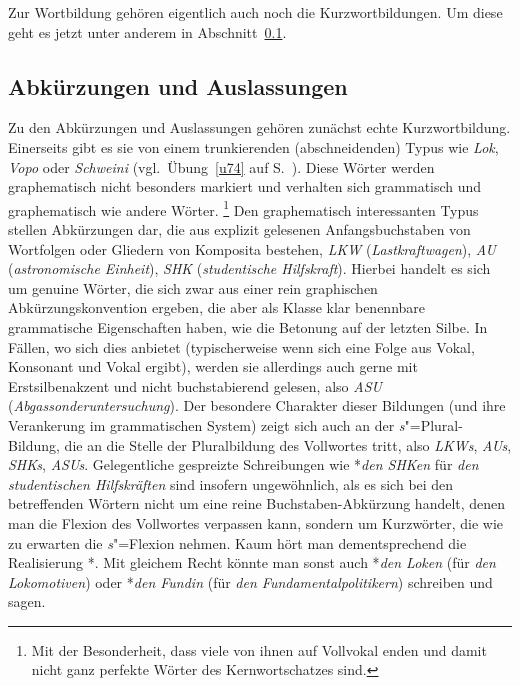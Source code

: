 Zur Wortbildung gehören eigentlich auch noch die Kurzwortbildungen.
Um diese geht es jetzt unter anderem in Abschnitt~\ref{sec:abkuerz}.

\subsection{Abkürzungen und Auslassungen}

\label{sec:abkuerz}

Zu den Abkürzungen und Auslassungen gehören zunächst echte Kurzwortbildung.
Einerseits gibt es sie von einem trunkierenden (abschneidenden) Typus wie \textit{Lok}, \textit{Vopo} oder \textit{Schweini} (vgl.\ Übung~\ref{u74} auf S.~\pageref{u74}).
Diese Wörter werden graphematisch nicht besonders markiert und verhalten sich grammatisch und graphematisch wie andere Wörter.%
\footnote{Mit der Besonderheit, dass viele von ihnen auf Vollvokal enden und damit nicht ganz perfekte Wörter des Kernwortschatzes sind.}
Den graphematisch interessanten Typus stellen Abkürzungen dar, die aus explizit gelesenen Anfangsbuchstaben von Wortfolgen oder Gliedern von Komposita bestehen, \zB \textit{LKW} \textipa{[PElkave:]} (\textit{Lastkraftwagen}), \textit{AU} \textipa{[Pa:Pu:]} (\textit{astronomische Einheit}), \textit{SHK} \textipa{[PEshaka:]} (\textit{studentische Hilfskraft}).
Hierbei handelt es sich um genuine Wörter, die sich zwar aus einer rein graphischen Abkürzungskonvention ergeben, die aber als Klasse klar benennbare grammatische Eigenschaften haben, wie \zB die Betonung auf der letzten Silbe.
In Fällen, wo sich dies anbietet (typischerweise wenn sich eine Folge aus Vokal, Konsonant und Vokal ergibt), werden sie allerdings auch gerne mit Erstsilbenakzent und nicht buchstabierend gelesen, also \textit{ASU} \textipa{[Pa:zu]} (\textit{Abgassonderuntersuchung}).
Der besondere Charakter dieser Bildungen (und ihre Verankerung im grammatischen System) zeigt sich auch an der \textit{s}"=Plural-Bildung, die an die Stelle der Pluralbildung des Vollwortes tritt, also \textit{LKWs}, \textit{AUs}, \textit{SHKs}, \textit{ASUs}.
Gelegentliche gespreizte Schreibungen wie *\textit{den SHKen} für \textit{den studentischen Hilfskräften} sind insofern ungewöhnlich, als es sich bei den betreffenden Wörtern nicht um eine reine Buchstaben-Abkürzung handelt, denen man die Flexion des Vollwortes verpassen kann, sondern um Kurzwörter, die wie zu erwarten die \textit{s}"=Flexion nehmen.
Kaum hört man dementsprechend die Realisierung *\textipa{[PEshaka:@n]}.
Mit gleichem Recht könnte man sonst auch *\textit{den Loken} (für \textit{den Lokomotiven}) oder *\textit{den Fundin} (für \textit{den Fundamentalpolitikern}) schreiben und sagen.

